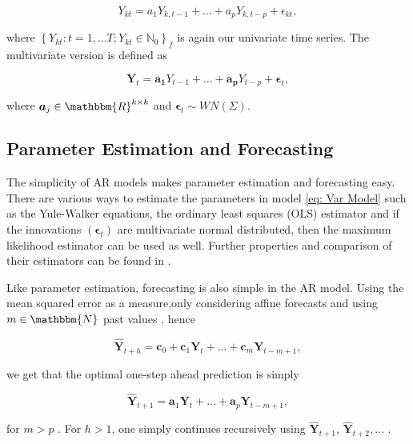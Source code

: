 \begin{equation}
Y_{kt} = a_1Y_{k,t-1} + \ldots + a_pY_{k,t-p} + \epsilon_{kt},
\label{eq: Ar model}
\end{equation}

where $\left\{Y_{kt}:t=1,\ldots T; Y_{kt} \in \mathbb{N}_0\right\}_f$ is again our univariate time series. The multivariate version is defined as 

\begin{equation}
\bm{Y}_{t} = \bm{a_1}Y_{t-1} + \ldots + \bm{a_p}Y_{t-p} + \bm{\epsilon}_{t},
\label{eq: Var Model}
\end{equation}

where $\bm{a}_j \in \mathbbm{R}^{k \times k}$ and $\bm{\epsilon}_t \sim WN(\Sigma)$.%

\subsection{Parameter Estimation and Forecasting}
\label{sec: AR Estimation and Forecasting}

The simplicity of AR models makes parameter estimation and forecasting easy. There are various ways to estimate the parameters in model \ref{eq: Var Model} such as the Yule-Walker equations, the ordinary least squares (OLS) estimator and if the innovations $(\bm{\epsilon}_t)$ are multivariate normal distributed, then the maximum likelihood estimator can be used as well. Further properties and comparison of their estimators can be found in \cite{Scherrer:2021}. 

Like parameter estimation, forecasting is also simple in the AR model. Using the mean squared error as a measure,only considering affine forecasts and using $m \in \mathbbm{N}$ past values , hence 

\begin{equation}
\hat{\bm{Y}}_{t+h} = \bm{c}_0 + \bm{c}_1\bm{Y}_{t} + \ldots + \bm{c}_m\bm{Y}_{t-m+1},
\label{eq:Forecasting general}
\end{equation}

we get that the optimal one-step ahead prediction is simply 

\begin{equation}
\hat{\bm{Y}}_{t+1} = \bm{a}_1\bm{Y}_{t} + \ldots + \bm{a}_p\bm{Y}_{t-m+1},
\label{eq:AR 1step Forecasting}
\end{equation}

for $m>p$ \cite{Scherrer:2021}. For $h>1$, one simply continues recursively using $\hat{\bm{Y}}_{t+1}$, $\hat{\bm{Y}}_{t+2},\ldots$ .


